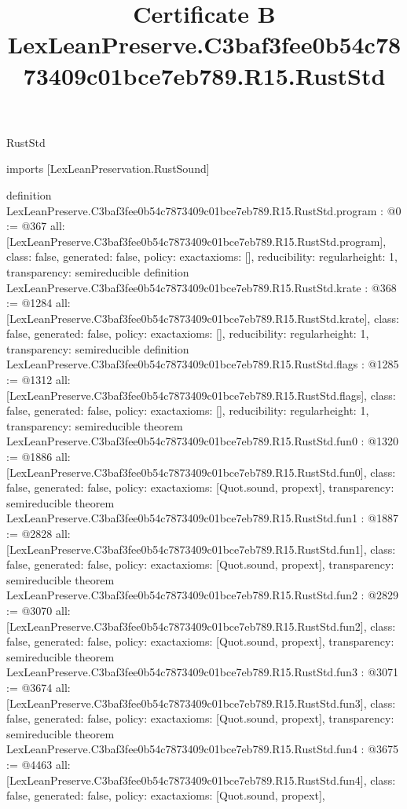 \begin{lexlean}{RustStd}
\title{Certificate B LexLeanPreserve.C3baf3fee0b54c7873409c01bce7eb789.R15.RustStd}
\begin{coremodule}
imports [LexLeanPreservation.RustSound]

definition LexLeanPreserve.C3baf3fee0b54c7873409c01bce7eb789.R15.RustStd.program : @0 := @367 {
  all: [LexLeanPreserve.C3baf3fee0b54c7873409c01bce7eb789.R15.RustStd.program],
  class: false,
  generated: false,
  policy: exact{axioms: []},
  reducibility: regular{height: 1},
  transparency: semireducible
}
definition LexLeanPreserve.C3baf3fee0b54c7873409c01bce7eb789.R15.RustStd.krate : @368 := @1284 {
  all: [LexLeanPreserve.C3baf3fee0b54c7873409c01bce7eb789.R15.RustStd.krate],
  class: false,
  generated: false,
  policy: exact{axioms: []},
  reducibility: regular{height: 1},
  transparency: semireducible
}
definition LexLeanPreserve.C3baf3fee0b54c7873409c01bce7eb789.R15.RustStd.flags : @1285 := @1312 {
  all: [LexLeanPreserve.C3baf3fee0b54c7873409c01bce7eb789.R15.RustStd.flags],
  class: false,
  generated: false,
  policy: exact{axioms: []},
  reducibility: regular{height: 1},
  transparency: semireducible
}
theorem LexLeanPreserve.C3baf3fee0b54c7873409c01bce7eb789.R15.RustStd.fun0 : @1320 := @1886 {
  all: [LexLeanPreserve.C3baf3fee0b54c7873409c01bce7eb789.R15.RustStd.fun0],
  class: false,
  generated: false,
  policy: exact{axioms: [Quot.sound, propext]},
  transparency: semireducible
}
theorem LexLeanPreserve.C3baf3fee0b54c7873409c01bce7eb789.R15.RustStd.fun1 : @1887 := @2828 {
  all: [LexLeanPreserve.C3baf3fee0b54c7873409c01bce7eb789.R15.RustStd.fun1],
  class: false,
  generated: false,
  policy: exact{axioms: [Quot.sound, propext]},
  transparency: semireducible
}
theorem LexLeanPreserve.C3baf3fee0b54c7873409c01bce7eb789.R15.RustStd.fun2 : @2829 := @3070 {
  all: [LexLeanPreserve.C3baf3fee0b54c7873409c01bce7eb789.R15.RustStd.fun2],
  class: false,
  generated: false,
  policy: exact{axioms: [Quot.sound, propext]},
  transparency: semireducible
}
theorem LexLeanPreserve.C3baf3fee0b54c7873409c01bce7eb789.R15.RustStd.fun3 : @3071 := @3674 {
  all: [LexLeanPreserve.C3baf3fee0b54c7873409c01bce7eb789.R15.RustStd.fun3],
  class: false,
  generated: false,
  policy: exact{axioms: [Quot.sound, propext]},
  transparency: semireducible
}
theorem LexLeanPreserve.C3baf3fee0b54c7873409c01bce7eb789.R15.RustStd.fun4 : @3675 := @4463 {
  all: [LexLeanPreserve.C3baf3fee0b54c7873409c01bce7eb789.R15.RustStd.fun4],
  class: false,
  generated: false,
  policy: exact{axioms: [Quot.sound, propext]},
}
\end{coremodule}
\end{lexlean}
